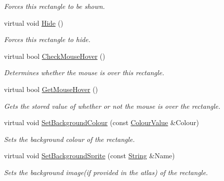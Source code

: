 \begin{DoxyCompactItemize}
\begin{DoxyCompactList}\small\item\em Forces this rectangle to be shown. \item\end{DoxyCompactList}\item 
\hypertarget{classphys_1_1UI_1_1Rectangle_a25bad72cff62c5c69b224bcb74304661}{
virtual void \hyperlink{classphys_1_1UI_1_1Rectangle_a25bad72cff62c5c69b224bcb74304661}{Hide} ()}
\label{classphys_1_1UI_1_1Rectangle_a25bad72cff62c5c69b224bcb74304661}

\begin{DoxyCompactList}\small\item\em Forces this rectangle to hide. \item\end{DoxyCompactList}\item 
virtual bool \hyperlink{classphys_1_1UI_1_1Rectangle_a246070a93416c2c50d63720b354154d7}{CheckMouseHover} ()
\begin{DoxyCompactList}\small\item\em Determines whether the mouse is over this rectangle. \item\end{DoxyCompactList}\item 
virtual bool \hyperlink{classphys_1_1UI_1_1Rectangle_a20903adb6d1b8650d73774190a2b9c57}{GetMouseHover} ()
\begin{DoxyCompactList}\small\item\em Gets the stored value of whether or not the mouse is over the rectangle. \item\end{DoxyCompactList}\item 
virtual void \hyperlink{classphys_1_1UI_1_1Rectangle_a687b524b89e6a76bc102b60023d36abd}{SetBackgroundColour} (const \hyperlink{classphys_1_1ColourValue}{ColourValue} \&Colour)
\begin{DoxyCompactList}\small\item\em Sets the background colour of the rectangle. \item\end{DoxyCompactList}\item 
virtual void \hyperlink{classphys_1_1UI_1_1Rectangle_ae9cc47125e075aaa9bfd397762de6e0c}{SetBackgroundSprite} (const \hyperlink{namespacephys_aa03900411993de7fbfec4789bc1d392e}{String} \&Name)
\begin{DoxyCompactList}\small\item\em Sets the background image(if provided in the atlas) of the rectangle. \item\end{DoxyCompactList}\item 

\end{DoxyCompactItemize}
